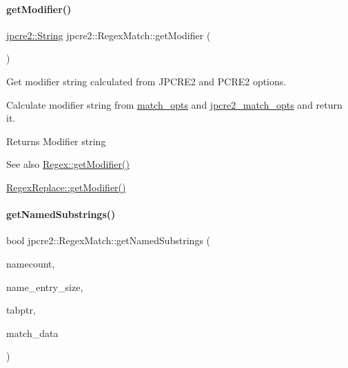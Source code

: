 \paragraph{\texorpdfstring{get\+Modifier()}{getModifier()}}
{\footnotesize\ttfamily \hyperlink{namespacejpcre2_a91f03070152fb228bc116c5a737f1d16}{jpcre2\+::\+String} jpcre2\+::\+Regex\+Match\+::get\+Modifier (\begin{DoxyParamCaption}{ }\end{DoxyParamCaption})}



Get modifier string calculated from J\+P\+C\+R\+E2 and P\+C\+R\+E2 options. 

Calculate modifier string from \hyperlink{classjpcre2_1_1RegexMatch_a697d5731007350b0f20d2018fcfafa90}{match\+\_\+opts} and \hyperlink{classjpcre2_1_1RegexMatch_a70d62df887eeed237724f64fbc378700}{jpcre2\+\_\+match\+\_\+opts} and return it.

\begin{DoxyReturn}{Returns}
Modifier string 
\end{DoxyReturn}
\begin{DoxySeeAlso}{See also}
\hyperlink{classjpcre2_1_1Regex_a0ac4e063f00128b96cd94c33609dc559_a0ac4e063f00128b96cd94c33609dc559}{Regex\+::get\+Modifier()} 

\hyperlink{classjpcre2_1_1RegexReplace_a4c325837716be3a48e2f92a80790d49f_a4c325837716be3a48e2f92a80790d49f}{Regex\+Replace\+::get\+Modifier()} 
\end{DoxySeeAlso}
\hypertarget{classjpcre2_1_1RegexMatch_ab5eec3f2e862236626043c84570f000b_ab5eec3f2e862236626043c84570f000b}{}\label{classjpcre2_1_1RegexMatch_ab5eec3f2e862236626043c84570f000b_ab5eec3f2e862236626043c84570f000b} 
\paragraph{\texorpdfstring{get\+Named\+Substrings()}{getNamedSubstrings()}}
{\footnotesize\ttfamily bool jpcre2\+::\+Regex\+Match\+::get\+Named\+Substrings (\begin{DoxyParamCaption}\item[{int}]{namecount,  }\item[{int}]{name\+\_\+entry\+\_\+size,  }\item[{P\+C\+R\+E2\+\_\+\+S\+P\+TR}]{tabptr,  }\item[{pcre2\+\_\+match\+\_\+data $\ast$}]{match\+\_\+data }\end{DoxyParamCaption})\hspace{0.3cm}{\ttfamily [private]}}




